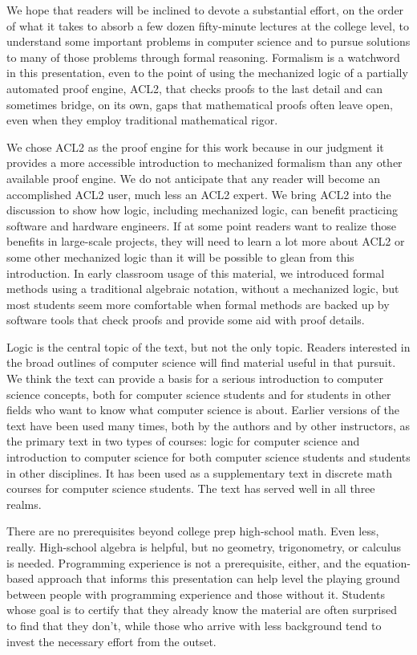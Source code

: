 We hope that readers will be inclined
to devote a substantial effort, on the order
of what it takes to absorb a few dozen fifty-minute
lectures at the college level,
to understand some important problems in computer science and
to pursue solutions to many of those problems through formal reasoning.
Formalism is a watchword in this presentation, even to the
point of using the mechanized logic of a partially automated proof engine,
ACL2, that checks proofs to the last detail and can sometimes
bridge, on its own, gaps that mathematical
proofs often leave open, even when they employ traditional
mathematical rigor.

We chose ACL2 as the proof engine for this work
because in our judgment it provides a more accessible
introduction to mechanized formalism than any other
available proof engine. We do not anticipate that any
reader will become an accomplished ACL2 user,
much less an ACL2 expert. We bring ACL2 into the discussion
to show how logic, including mechanized logic,
can benefit practicing software and hardware engineers.
If at some point readers want to realize those benefits in
large-scale projects, they will need to learn a lot more
about ACL2 or some other mechanized logic than it will
be possible to glean from this introduction.
In early classroom usage of this material,
we introduced formal methods using a traditional algebraic notation,
without a mechanized logic, but most students seem more comfortable
when formal methods are backed up by software tools
that check proofs and provide some aid with proof details.

Logic is the central topic of the text, but not the only topic.
Readers interested in the broad outlines of computer science
will find material useful in that pursuit.
We think the text can provide a basis for a serious introduction
to computer science concepts, both for computer science students
and for students in other fields who want to know
what computer science is about.
Earlier versions of the text have been used many times,
both by the authors and by other instructors,
as the primary text in two types of courses: logic for computer science
and introduction to computer science for both computer science students
and students in other disciplines. It has been used as a supplementary
text in discrete math courses for computer science students.
The text has served well in all three realms.

There are no prerequisites beyond college prep high-school math.
Even less, really.
High-school algebra is helpful,
but no geometry, trigonometry, or calculus is needed.
Programming experience is not a prerequisite, either, and
the equation-based approach that informs this presentation can
help level the playing ground between people
with programming experience and those without it.
Students whose goal is to certify that they already
know the material are often surprised to find that they don't,
while those who arrive with less background tend
to invest the necessary effort from the outset.

